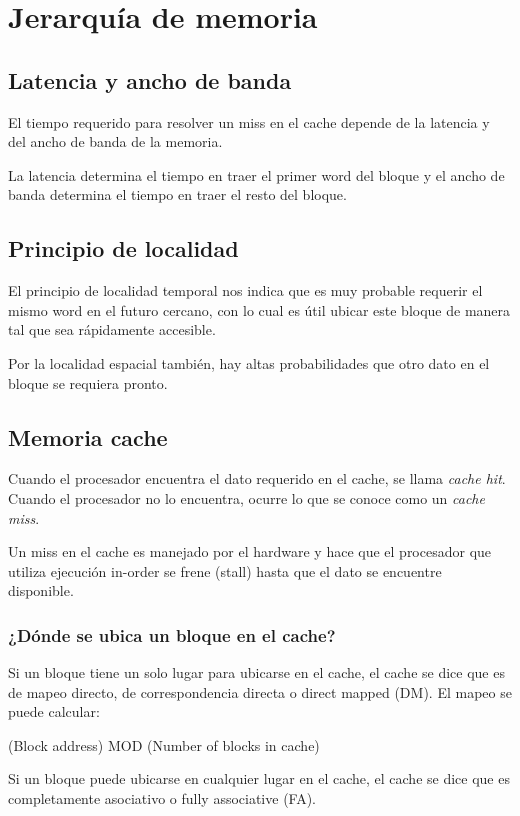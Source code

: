 \chapter{Jerarquía de memoria}

\section{Latencia y ancho de banda}
El tiempo requerido para resolver un miss en el cache depende de la latencia y del ancho de banda de la memoria.

La latencia determina el tiempo en traer el primer word del bloque y el ancho de banda determina el tiempo en traer el resto del bloque.

\section{Principio de localidad}
El principio de localidad temporal nos indica que es muy probable requerir el mismo word en el futuro cercano, con lo cual es útil ubicar este bloque de manera tal que sea rápidamente accesible.

Por la localidad espacial también, hay altas probabilidades que otro dato en el bloque se requiera pronto.

\section{Memoria cache}
Cuando el procesador encuentra el dato requerido en el cache, se llama \textit{cache hit}. Cuando el procesador no lo encuentra, ocurre lo que se conoce como un \textit{cache miss}.

Un miss en el cache es manejado por el hardware y hace que el procesador que utiliza ejecución in-order se frene (stall) hasta que el dato se encuentre disponible.


\subsection{¿Dónde se ubica un bloque en el cache?}
Si un bloque tiene un solo lugar para ubicarse en el cache, el cache se dice que es de mapeo directo, de correspondencia directa o direct mapped (DM). El mapeo se puede calcular:

(Block address) MOD (Number of blocks in cache)

Si un bloque puede ubicarse en cualquier lugar en el cache, el cache se dice que es completamente asociativo o fully associative (FA).


